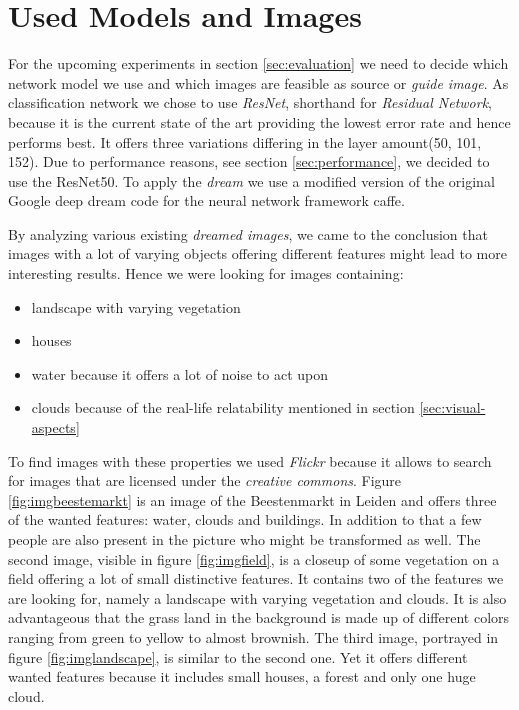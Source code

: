 \section{Used Models and Images}
\label{sec:data}
For the upcoming experiments in section \ref{sec:evaluation} we need to decide which network model we use and which images are feasible as source or \emph{guide image}.
As classification network we chose to use \emph{ResNet}\cite{he2016deep}, shorthand for \emph{Residual Network}, because it is the current state of the art providing the lowest error rate and hence performs best.\cite{cnnComparison}
It offers three variations differing in the layer amount(50, 101, 152).
Due to performance reasons, see section \ref{sec:performance}, we decided to use the ResNet50.
To apply the \emph{dream} we use a modified version of the original Google deep dream code\cite{deep-dream-github} for the neural network framework caffe\cite{jia2014caffe}.

By analyzing various existing \emph{dreamed images}, we came to the conclusion that images with a lot of varying objects offering different features might lead to more interesting results.
Hence we were looking for images containing: 
\begin{itemize}
	\item landscape with varying vegetation
	\item houses
	\item water because it offers a lot of noise to act upon
	\item clouds because of the real-life relatability mentioned in section \ref{sec:visual-aspects}
\end{itemize}

To find images with these properties we used \emph{Flickr} because it allows to search for images that are licensed under the \emph{creative commons}.
Figure \ref{fig:imgbeestemarkt} is an image of the Beestenmarkt in Leiden and offers three of the wanted features: water, clouds and buildings.
In addition to that a few people are also present in the picture who might be transformed as well.
The second image, visible in figure \ref{fig:imgfield}, is a closeup of some vegetation on a field offering a lot of small distinctive features.
It contains two of the features we are looking for, namely a landscape with varying vegetation and clouds. It is also advantageous that the grass land in the background is made up of different colors ranging from green to yellow to almost brownish.
The third image, portrayed in figure \ref{fig:imglandscape}, is similar to the second one. Yet it offers different wanted features because it includes small houses, a forest and only one huge cloud.



